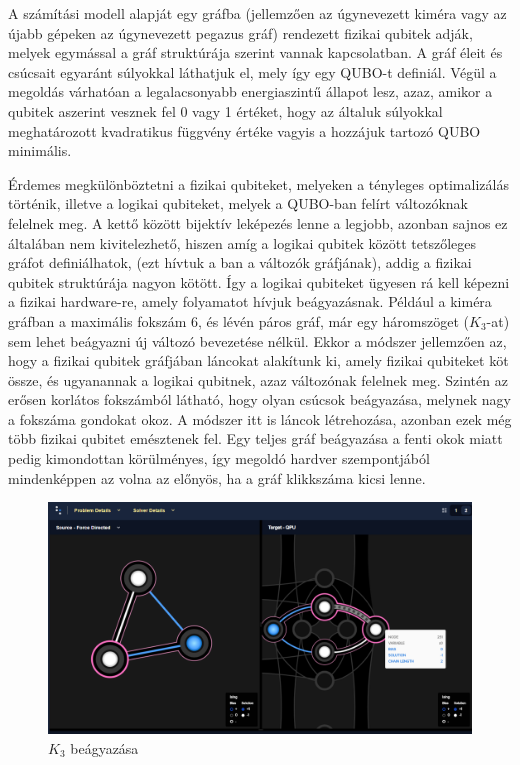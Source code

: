 A számítási modell alapját egy gráfba (jellemzően az úgynevezett kiméra vagy az újabb gépeken az úgynevezett pegazus gráf) rendezett fizikai qubitek adják, melyek  egymással a gráf struktúrája szerint vannak kapcsolatban. A gráf éleit és csúcsait egyaránt súlyokkal láthatjuk el, mely így egy QUBO-t definiál. Végül a megoldás várhatóan a legalacsonyabb energiaszintű állapot lesz, azaz, amikor a qubitek aszerint vesznek fel 0 vagy 1 értéket, hogy az általuk súlyokkal meghatározott kvadratikus függvény értéke vagyis a hozzájuk tartozó QUBO minimális.

Érdemes megkülönböztetni a fizikai qubiteket, melyeken a tényleges optimalizálás történik, illetve a logikai qubiteket, melyek a QUBO-ban felírt változóknak felelnek meg. A kettő között bijektív leképezés lenne a legjobb, azonban sajnos ez általában nem kivitelezhető, hiszen amíg a logikai qubitek között tetszőleges gráfot definiálhatok, (ezt hívtuk a ban a változók gráfjának), addig a fizikai qubitek struktúrája nagyon kötött. Így a logikai qubiteket ügyesen rá kell képezni a fizikai hardware-re, amely folyamatot hívjuk beágyazásnak.
Például a kiméra gráfban a maximális fokszám 6, és lévén páros gráf, már egy háromszöget ($K_3$-at) sem lehet beágyazni új változó bevezetése nélkül. Ekkor a módszer jellemzően az, hogy a fizikai qubitek gráfjában láncokat alakítunk ki, amely fizikai qubiteket köt össze, és ugyanannak a logikai qubitnek, azaz változónak felelnek meg. Szintén az erősen korlátos fokszámból látható, hogy olyan csúcsok beágyazása, melynek nagy a fokszáma gondokat okoz. A módszer itt is láncok létrehozása, azonban ezek még több fizikai qubitet emésztenek fel. Egy teljes gráf beágyazása a fenti okok miatt pedig kimondottan körülményes, így megoldó hardver szempontjából mindenképpen az volna az előnyös, ha a gráf klikkszáma kicsi lenne.

\begin{figure}[!ht]
	\centering
	\includegraphics[width=150mm, keepaspectratio]{figures/embedding_3var4qubits.png}
	\caption{$K_3$ beágyazása}
	\label{fig:K3embedding}
\end{figure}

